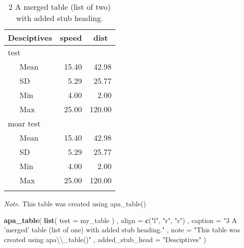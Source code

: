 \documentclass[english,man]{apa6}
\newenvironment{Shaded}{\begin{snugshade}}{\end{snugshade}}
\newcommand{\KeywordTok}[1]{\textcolor[rgb]{0.13,0.29,0.53}{\textbf{{#1}}}}
\newcommand{\DataTypeTok}[1]{\textcolor[rgb]{0.13,0.29,0.53}{{#1}}}
\newcommand{\CharTok}[1]{\textcolor[rgb]{0.31,0.60,0.02}{{#1}}}
\newcommand{\StringTok}[1]{\textcolor[rgb]{0.31,0.60,0.02}{{#1}}}
\newcommand{\NormalTok}[1]{{#1}}
\theoremstyle{definition}
\theoremstyle{definition}
\theoremstyle{definition}
\theoremstyle{remark}
\begin{document}
\begin{table}[tbp]
\begin{center}
\begin{threeparttable}
\caption{\label{tab:unnamed-chunk-3}2 A merged table (list of two) with added stub heading.}
\begin{tabular}{lrr}
\toprule
Desciptives & \multicolumn{1}{c}{speed} & \multicolumn{1}{c}{dist}\\
\midrule
test &  & \\
\ \ \ Mean & 15.40 & 42.98\\
\ \ \ SD & 5.29 & 25.77\\
\ \ \ Min & 4.00 & 2.00\\
\ \ \ Max & 25.00 & 120.00\\
moar test &  & \\
\ \ \ Mean & 15.40 & 42.98\\
\ \ \ SD & 5.29 & 25.77\\
\ \ \ Min & 4.00 & 2.00\\
\ \ \ Max & 25.00 & 120.00\\
\bottomrule
\addlinespace
\end{tabular}
\begin{tablenotes}[para]
\textit{Note.} This table was created using apa\_table()
\end{tablenotes}
\end{threeparttable}
\end{center}
\end{table}

\begin{Shaded}
\begin{Highlighting}[]
\KeywordTok{apa_table}\NormalTok{(}
  \KeywordTok{list}\NormalTok{(}
    \DataTypeTok{test =} \NormalTok{my_table}
  \NormalTok{)}
  \NormalTok{, }\DataTypeTok{align =} \KeywordTok{c}\NormalTok{(}\StringTok{"l"}\NormalTok{, }\StringTok{"r"}\NormalTok{, }\StringTok{"r"}\NormalTok{)}
  \NormalTok{, }\DataTypeTok{caption =} \StringTok{"3 A 'merged' table (list of one) with added stub heading."}
  \NormalTok{, }\DataTypeTok{note =} \StringTok{"This table was created using apa}\CharTok{\textbackslash{}\textbackslash{}}\StringTok{_table()"}
  \NormalTok{, }\DataTypeTok{added_stub_head =} \StringTok{"Desciptives"}
\NormalTok{)}
\end{Highlighting}
\end{Shaded}
\end{document}
